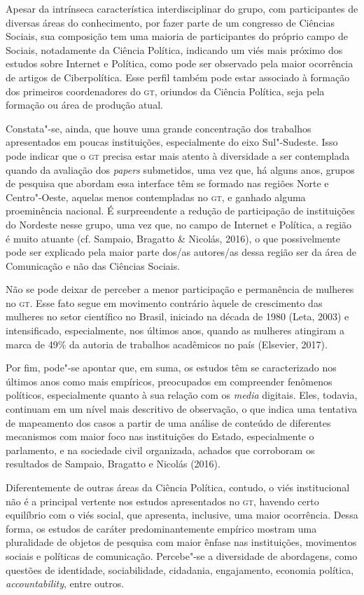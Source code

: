 Apesar da intrínseca característica interdisciplinar do grupo, com
participantes de diversas áreas do conhecimento, por fazer parte de um
congresso de Ciências Sociais, sua composição tem uma maioria de
participantes do próprio campo de Sociais, notadamente da Ciência
Política, indicando um viés mais próximo dos estudos sobre Internet e
Política, como pode ser observado pela maior ocorrência de artigos de
Ciberpolítica. Esse perfil também pode estar associado à formação dos
primeiros coordenadores do \textsc{gt}, oriundos da Ciência Política, seja pela
formação ou área de produção atual.

Constata"-se, ainda, que houve uma grande concentração dos trabalhos
apresentados em poucas instituições, especialmente do eixo Sul"-Sudeste.
Isso pode indicar que o \textsc{gt} precisa estar mais atento à diversidade a ser
contemplada quando da avaliação dos \emph{papers} submetidos, uma vez
que, há alguns anos, grupos de pesquisa que abordam essa interface têm
se formado nas regiões Norte e Centro"-Oeste, aquelas menos contempladas
no \textsc{gt}, e ganhado alguma proeminência nacional. É surpreendente a redução
de participação de instituições do Nordeste nesse grupo, uma vez que, no
campo de Internet e Política, a região é muito atuante (cf. Sampaio,
Bragatto \& Nicolás, 2016), o que possivelmente pode ser explicado pela
maior parte dos/as autores/as dessa região ser da área de Comunicação e
não das Ciências Sociais.

Não se pode deixar de perceber a menor participação e permanência de
mulheres no \textsc{gt}. Esse fato segue em movimento contrário àquele de
crescimento das mulheres no setor científico no Brasil, iniciado na
década de 1980 (Leta, 2003) e intensificado, especialmente, nos últimos
anos, quando as mulheres atingiram a marca de 49\% da autoria de
trabalhos acadêmicos no país (Elsevier, 2017).

Por fim, pode"-se apontar que, em suma, os estudos têm se caracterizado
nos últimos anos como mais empíricos, preocupados em compreender
fenômenos políticos, especialmente quanto à sua relação com os
\emph{media} digitais. Eles, todavia, continuam em um nível mais
descritivo de observação, o que indica uma tentativa de mapeamento dos
casos a partir de uma análise de conteúdo de diferentes mecanismos com
maior foco nas instituições do Estado, especialmente o parlamento, e na
sociedade civil organizada, achados que corroboram os resultados de
Sampaio, Bragatto e Nicolás (2016).

Diferentemente de outras áreas da Ciência Política, contudo, o viés
institucional não é a principal vertente nos estudos apresentados no \textsc{gt},
havendo certo equilíbrio com o viés social, que apresenta, inclusive,
uma maior ocorrência. Dessa forma, os estudos de caráter
predominantemente empírico mostram uma pluralidade de objetos de
pesquisa com maior ênfase nas instituições, movimentos sociais e
políticas de comunicação. Percebe"-se a diversidade de abordagens, como
questões de identidade, sociabilidade, cidadania, engajamento, economia
política, \emph{accountability}, entre outros.

